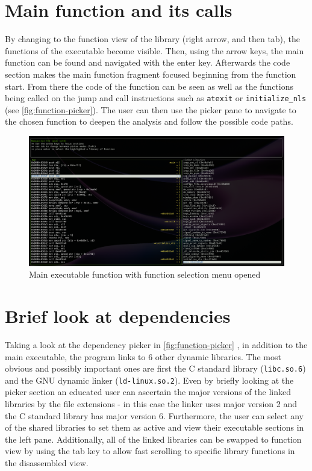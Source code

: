 \section{Main function and its calls}

By changing to the function view of the library (right arrow, and then tab), the functions of the executable become visible.
Then, using the arrow keys, the main function can be found and navigated with the enter key.
Afterwards the code section makes the main function fragment focused beginning from the function start.
From there the code of the function can be seen as well as the functions being called on the jump and call instructions such as \verb|atexit| or \verb|initialize_nls| (see \autoref{fig:function-picker}).
The user can then use the picker pane to navigate to the chosen function to deepen the analysis and follow the possible code paths.

\begin{figure}
    \centering
    \includegraphics[width=1\linewidth]{tui-function-select.png}
    \caption{Main executable function with function selection menu opened}
    \label{fig:function-picker}
\end{figure}

\section{Brief look at dependencies}

Taking a look at the dependency picker in \autoref{fig:function-picker} , in addition to the main executable, the program links to 6 other dynamic libraries.
The most obvious and possibly important ones are first the C standard library (\verb|libc.so.6|) and the GNU dynamic linker (\verb|ld-linux.so.2|).
Even by briefly looking at the picker section an educated user can ascertain the major versions of the linked libraries by the file extensions - in this case the linker uses major version 2 and the C standard library has major version 6.
Furthermore, the user can select any of the shared libraries to set them as active and view their executable sections in the left pane.
Additionally, all of the linked libraries can be swapped to function view by using the tab key to allow fast scrolling to specific library functions in the disassembled view.

